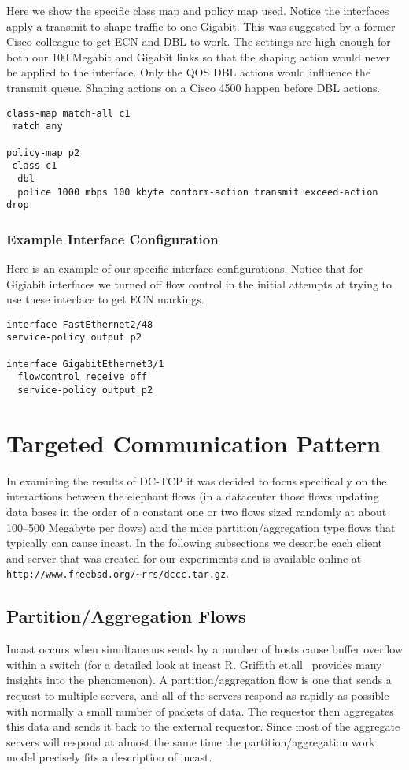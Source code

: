 \documentclass[12pt]{article}
\begin{document}
Here we show the specific class map and policy map used. Notice
the interfaces apply a  transmit to shape traffic to one Gigabit. This was suggested
by a former Cisco colleague to get ECN and DBL to work. The settings
are high enough for both our 100 Megabit and Gigabit links so that 
the shaping action would never be applied to the interface. Only the
QOS DBL actions would influence the transmit queue. Shaping actions
on a Cisco 4500 happen before DBL actions.
\begin{verbatim}
class-map match-all c1
 match any 

policy-map p2
 class c1 
  dbl  
  police 1000 mbps 100 kbyte conform-action transmit exceed-action drop 
\end{verbatim}
\subsubsection {Example Interface Configuration}

Here is an example of our specific interface configurations. Notice that 
for Gigiabit interfaces we turned off flow control in the initial attempts at
trying to use these interface to get ECN markings.
\begin{verbatim}
interface FastEthernet2/48
service-policy output p2

interface GigabitEthernet3/1
  flowcontrol receive off
  service-policy output p2
\end{verbatim}

 
\section{Targeted Communication Pattern}
In examining the results of DC-TCP it was decided to focus specifically on the interactions between
the elephant flows (in a datacenter those flows updating data bases in the order of a constant one or two flows
sized randomly at about 100--500 Megabyte per flows) and the mice partition/aggregation type flows that typically 
can cause incast. In the following subsections we describe each client and server that was created for
our experiments and is available online at \texttt{http://www.freebsd.org/\textasciitilde rrs/dccc.tar.gz}.

\subsection{Partition/Aggregation Flows}
\label{partition}

Incast occurs when simultaneous sends by a number of hosts cause buffer overflow within
a switch (for a detailed look at incast R. Griffith et.all~\cite{griffen}  provides many insights into the phenomenon). A
partition/aggregation flow is one that sends a request to multiple servers, and all of the servers respond
as rapidly as possible with normally a small number of packets of data. The requestor then aggregates
this data and sends it back to the external requestor. Since most of the aggregate servers will respond
at almost the same time the partition/aggregation work model precisely fits a description of incast. 
\end{document}
